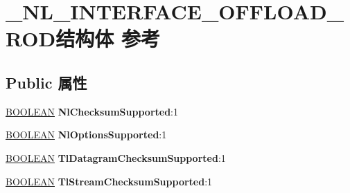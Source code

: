 \hypertarget{struct___n_l___i_n_t_e_r_f_a_c_e___o_f_f_l_o_a_d___r_o_d}{}\section{\+\_\+\+N\+L\+\_\+\+I\+N\+T\+E\+R\+F\+A\+C\+E\+\_\+\+O\+F\+F\+L\+O\+A\+D\+\_\+\+R\+O\+D结构体 参考}
\label{struct___n_l___i_n_t_e_r_f_a_c_e___o_f_f_l_o_a_d___r_o_d}
\subsection*{Public 属性}
\begin{DoxyCompactItemize}
\item 
\mbox{\label{struct___n_l___i_n_t_e_r_f_a_c_e___o_f_f_l_o_a_d___r_o_d_a07028a33dabd1dc4d24b3130de16f148}} 
\hyperlink{_processor_bind_8h_a112e3146cb38b6ee95e64d85842e380a}{B\+O\+O\+L\+E\+AN} {\bfseries Nl\+Checksum\+Supported}\+:1
\item 
\mbox{\label{struct___n_l___i_n_t_e_r_f_a_c_e___o_f_f_l_o_a_d___r_o_d_ab9715a2f70b895cf91658793897b985b}} 
\hyperlink{_processor_bind_8h_a112e3146cb38b6ee95e64d85842e380a}{B\+O\+O\+L\+E\+AN} {\bfseries Nl\+Options\+Supported}\+:1
\item 
\mbox{\label{struct___n_l___i_n_t_e_r_f_a_c_e___o_f_f_l_o_a_d___r_o_d_adf526e1f1c8d62b7732611ffe3354b85}} 
\hyperlink{_processor_bind_8h_a112e3146cb38b6ee95e64d85842e380a}{B\+O\+O\+L\+E\+AN} {\bfseries Tl\+Datagram\+Checksum\+Supported}\+:1
\item 
\mbox{\label{struct___n_l___i_n_t_e_r_f_a_c_e___o_f_f_l_o_a_d___r_o_d_abe526e9c526f2d8a57843ccceb1d695a}} 
\hyperlink{_processor_bind_8h_a112e3146cb38b6ee95e64d85842e380a}{B\+O\+O\+L\+E\+AN} {\bfseries Tl\+Stream\+Checksum\+Supported}\+:1
\item 
\mbox{\label{struct___n_l___i_n_t_e_r_f_a_c_e___o_f_f_l_o_a_d___r_o_d_aac64c78648fb9efdb611f9edfeac08d1}} 

\end{DoxyCompactItemize}
